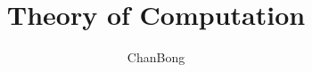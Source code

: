 \documentclass[a4paper]{report}
\author{ChanBong}
\title{Theory of Computation}
\begin{document}
    \maketitle
    \tableofcontents
    \pagebreak
    
    
    
    
\end{document}
